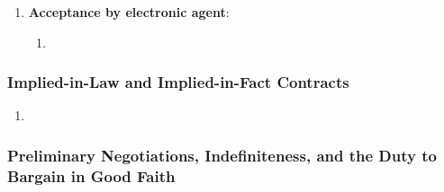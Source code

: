 \begin{enumerate}
\begin{enumerate}
        say that a seller of goods like these could wait indefinitely to 
        decide whether or not he will accept the offer of the proposed 
        buyer.''\footnote{Casebook p. 497.} \emph{Cole-McIntyre-Norfleet Co. 
        v. Holloway}. In some cases, there is a duty to promptly reply, and 
        unreasonable delay will count as acceptance---e.g., a hail insurer 
        waiting two months to send a rejection. \emph{Kukusa v. Home Mut. 
        Hail-Tornado Ins. Co.}
        \item Repeated orders for the same product can count as a \textbf{standing 
        offer}. If the buyer does not reject future shipments, his silence 
        counts as acceptance. \emph{Hobbs v. Massasoit Whip Co.}
        \item Taking physical control of shipped goods counts as acceptance of 
        the shipment. \emph{Louisville Tin \& Stove Co. v. Lay}.
        \item If you enjoy the benefit of an unwanted thing, you have to pay 
        for it---e.g., an expired newspaper subscription. \emph{Austin v. 
        Burge}.
        \item A \textbf{negative-option} plan involves a subscription for 
        merchandise, like a book or record club. They differ from unordered 
        goods in that the customer contracts in advance.
    \end{enumerate}
    \item \textbf{Acceptance by electronic agent}:
    \begin{enumerate}
        \item %
    \end{enumerate}
\end{enumerate}

\subsubsection{Implied-in-Law and Implied-in-Fact Contracts}

\begin{enumerate}
    \item %
\end{enumerate}

\subsubsection{Preliminary Negotiations, Indefiniteness, and the Duty to 
Bargain in Good Faith}

